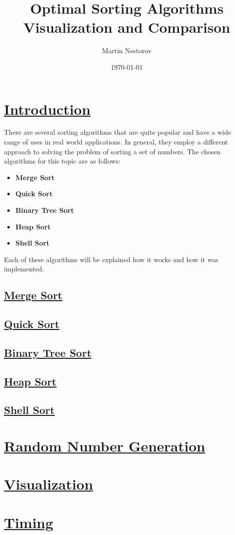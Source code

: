 \documentclass{article}
\title{Optimal Sorting Algorithms\\Visualization and Comparison}
\date{\today}
\author{Martin Nestorov}
\begin{document}
\maketitle
{}

\newpage

\section{\underline{Introduction}}

There are several sorting algorithms that are quite popular and have a wide range of uses in real world applications. In general, they employ a different approach to solving the problem of sorting a set of numbers. The chosen algorithms for this topic are as follows:

\begin{itemize}
\item \textbf{Merge Sort}
\item \textbf{Quick Sort}
\item \textbf{Binary Tree Sort}
\item \textbf{Heap Sort}
\item \textbf{Shell Sort}
\end{itemize}

Each of these algorithms will be explained how it works and how it was implemented.

\subsection{\underline{Merge Sort}}

\subsection{\underline{Quick Sort}}

\subsection{\underline{Binary Tree Sort}}

\subsection{\underline{Heap Sort}}

\subsection{\underline{Shell Sort}}

\section{\underline{Random Number Generation}}

\section{\underline{Visualization}}

\section{\underline{Timing}}
\end{document}
